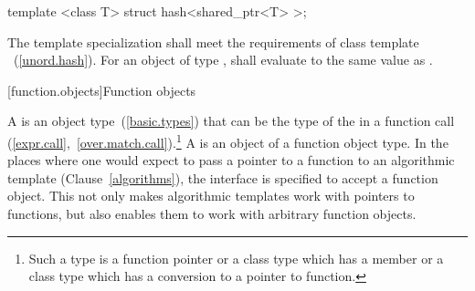 %
\begin{itemdecl}
template <class T> struct hash<shared_ptr<T> >;
\end{itemdecl}

\begin{itemdescr}
\pnum
The template specialization shall meet the requirements of class
template ~(\ref{unord.hash}). For an object  of type ,
 shall evaluate to
the same value as .
\end{itemdescr}%

[function.objects]{Function objects}

\pnum
A  is an object
type~(\ref{basic.types}) that can be the type of the
 in a function call
(\ref{expr.call},~\ref{over.match.call}).\footnote{Such a type is a function
pointer or a class type which has a member  or a class type
which has a conversion to a pointer to function.} A  is an
object of a function object type. In the places where one would expect to pass a
pointer to a function to an algorithmic template (Clause~\ref{algorithms}), the
interface is specified to accept a function object. This not only makes
algorithmic templates work with pointers to functions, but also enables them to
work with arbitrary function objects.

\pnum
{}

